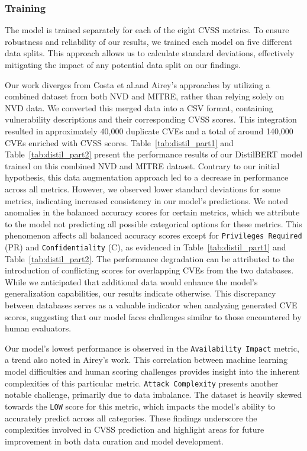 \documentclass[12pt]{article}
\begin{document}
\subsubsection{Training}

The model is trained separately for each of the eight CVSS metrics. To ensure robustness and
reliability of our results, we trained each model on five different data splits. This approach
allows us to calculate standard deviations, effectively mitigating the impact of any potential
 data split on our findings.

Our work diverges from Costa et al.\@ and Airey's approaches by utilizing a combined dataset from both
NVD and MITRE, rather than relying solely on NVD data. We converted this merged data into a CSV
format, containing vulnerability descriptions and their corresponding CVSS scores. This integration
resulted in approximately 40,000 duplicate CVEs and a total of around 140,000 CVEs enriched with
CVSS scores. Table~\ref{tab:distil_part1} and Table~\ref{tab:distil_part2} present the performance
results of our DistilBERT model trained on this combined NVD and MITRE dataset. Contrary to our
initial hypothesis, this data augmentation approach led to a decrease in performance across all
metrics. However, we observed lower standard deviations for some metrics, indicating increased
consistency in our model's predictions. We noted anomalies in the balanced accuracy scores for
certain metrics, which we attribute to the model not predicting all possible categorical options for
these metrics. This phenomenon affects all balanced accuracy scores except for \texttt{Privileges
	Required}
(PR) and \texttt{Confidentiality} (C), as evidenced in Table~\ref{tab:distil_part1} and
Table~\ref{tab:distil_part2}. The performance degradation can be attributed to the introduction of
conflicting scores for overlapping CVEs from the two databases. While we anticipated that additional
data would enhance the model's generalization capabilities, our results indicate otherwise. This
discrepancy between databases serves as a valuable indicator when analyzing generated CVE scores,
suggesting that our model faces challenges similar to those encountered by human evaluators.

Our model's lowest performance is observed in the \texttt{Availability Impact} metric, a trend
also noted in Airey's work. This correlation between machine learning model difficulties and human
scoring challenges provides insight into the inherent complexities of this particular metric.
\texttt{Attack Complexity} presents another notable challenge, primarily due to data imbalance. The
dataset is heavily skewed towards the \texttt{LOW} score for this metric, which impacts the model's ability
to accurately predict across all categories. These findings underscore the complexities involved in
CVSS prediction and highlight areas for future improvement in both data curation and model
development.
\end{document}
